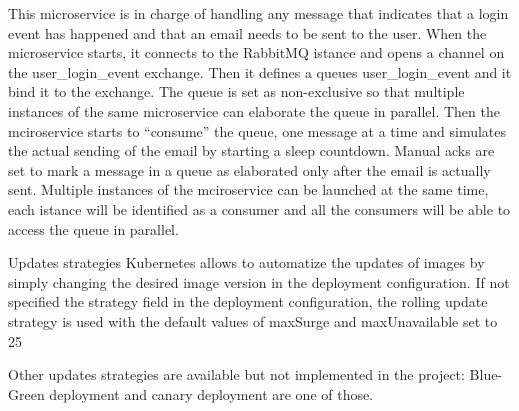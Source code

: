 \documentclass[sigplan,screen]{acmart}
\begin{document}
This microservice is in charge of handling any message that indicates that a login event has happened and that an email needs to be sent to the user. When the microservice starts, it connects to the RabbitMQ istance and opens a channel on the user_login_event exchange. Then it defines a queues user_login_event and it bind it to the exchange. The queue is set as non-exclusive so that multiple instances of the same microservice can elaborate the queue in parallel. Then the mciroservice starts to “consume” the queue, one message at a time and simulates the actual sending of the email by starting a sleep countdown. Manual acks are set to mark a message in a queue as elaborated only after the email is actually sent. Multiple instances of the mciroservice can be launched at the same time, each istance will be identified as a consumer and all the consumers will be able to access the queue in parallel.


Updates strategies
Kubernetes allows to automatize the updates of images by simply changing the desired image version in the deployment configuration. If not specified the strategy field in the deployment configuration, the rolling update strategy is used with the default values of maxSurge and maxUnavailable set to 25%

Other updates strategies are available but not implemented in the project: Blue-Green deployment and canary deployment are one of those. 
\end{document}
